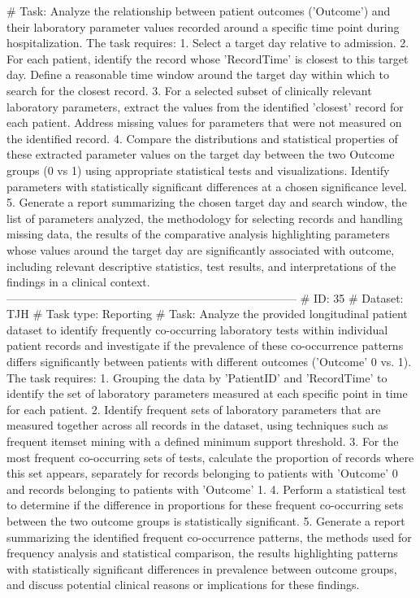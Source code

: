 \begin{tcolorbox}[colback=cadmiumgreen!5!white,colframe=forestgreen!75!white,breakable,title=\textit{Generated analytical tasks in task 4.}]
\begin{VerbatimWrap}
# Task: Analyze the relationship between patient outcomes ('Outcome') and their laboratory parameter values recorded around a specific time point during hospitalization. The task requires: 1. Select a target day relative to admission. 2. For each patient, identify the record whose 'RecordTime' is closest to this target day. Define a reasonable time window around the target day within which to search for the closest record. 3. For a selected subset of clinically relevant laboratory parameters, extract the values from the identified 'closest' record for each patient. Address missing values for parameters that were not measured on the identified record. 4. Compare the distributions and statistical properties of these extracted parameter values on the target day between the two Outcome groups (0 vs 1) using appropriate statistical tests and visualizations. Identify parameters with statistically significant differences at a chosen significance level. 5. Generate a report summarizing the chosen target day and search window, the list of parameters analyzed, the methodology for selecting records and handling missing data, the results of the comparative analysis highlighting parameters whose values around the target day are significantly associated with outcome, including relevant descriptive statistics, test results, and interpretations of the findings in a clinical context.
-----------------------------------------------------------------------------
# ID: 35  
# Dataset: TJH 
# Task type: Reporting
# Task: Analyze the provided longitudinal patient dataset to identify frequently co-occurring laboratory tests within individual patient records and investigate if the prevalence of these co-occurrence patterns differs significantly between patients with different outcomes ('Outcome' 0 vs. 1). The task requires: 1. Grouping the data by 'PatientID' and 'RecordTime' to identify the set of laboratory parameters measured at each specific point in time for each patient. 2. Identify frequent sets of laboratory parameters that are measured together across all records in the dataset, using techniques such as frequent itemset mining with a defined minimum support threshold. 3. For the most frequent co-occurring sets of tests, calculate the proportion of records where this set appears, separately for records belonging to patients with 'Outcome' 0 and records belonging to patients with 'Outcome' 1. 4. Perform a statistical test to determine if the difference in proportions for these frequent co-occurring sets between the two outcome groups is statistically significant. 5. Generate a report summarizing the identified frequent co-occurrence patterns, the methods used for frequency analysis and statistical comparison, the results highlighting patterns with statistically significant differences in prevalence between outcome groups, and discuss potential clinical reasons or implications for these findings.

\end{VerbatimWrap}
\end{tcolorbox}
